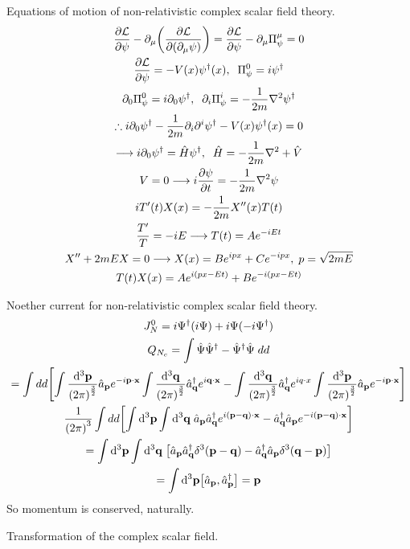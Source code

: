 \documentclass{report}
\begin{document}
\begin{subquests}
	\item Equations of motion of non-relativistic complex scalar field theory.
	\begin{gather*}
		\pdv{\mathcal L}{\psi} - \partial_{\mu}\pqty{\pdv{\mathcal L}{\pqty{\partial_{\mu}\psi}}} = \pdv{\mathcal L}{\psi} - \partial_{\mu}\Pi^{\mu}_{\psi} = 0 \\
		\pdv{\mathcal L}{\psi} = -V(x)\psi^{\dagger}(x), \;\; \Pi^0_{\psi} = i\psi^{\dagger} \\
		\partial_0\Pi^0_{\psi} = i\partial_0 \psi^{\dagger}, \;\; \partial_i \Pi^i_{\psi} = -\frac{1}{2m}\nabla^2\psi^{\dagger}\\
		\therefore i\partial_0 \psi^{\dagger} -\frac{1}{2m}\partial_i\partial^i\psi^{\dagger} - V(x)\psi^{\dagger}(x) = 0 \\
		\longrightarrow i\partial_0\psi^{\dagger} = \hat{H}\psi^{\dagger}, \;\; \hat{H} = -\frac{1}{2m}\nabla^2 + \hat{V} \\
		V = 0 \longrightarrow i\pdv{\psi}{t} = -\frac{1}{2m}\nabla^2\psi \\
		iT'(t)X(x) = -\frac{1}{2m}X''(x)T(t) \\
		\frac{T'}{T} = -iE \longrightarrow T(t) = Ae^{-iEt} \\
		X'' + 2mEX = 0 \longrightarrow X(x) = Be^{ipx} + Ce^{-ipx},\; p = \sqrt{2mE} \\
		T(t)X(x) = Ae^{i(px-Et)} + Be^{-i(px - Et)}
	\end{gather*}

	\item Noether current for non-relativistic complex scalar field theory.
	\begin{gather*}
		J^0_N = i\Psi^{\dagger}(i\Psi) + i\Psi(-i\Psi^{\dagger}) \\
		Q_{N_c} = \int \hat{\Psi}\hat{\Psi}^{\dagger} - \hat{\Psi}^{\dagger}\hat{\Psi}\;dd \\
		= \int dd\bqty{\int \frac{\dd^3{\vb p}}{\pqty{2\pi}^{\frac{3}{2}}}\hat{a}_{\vb p}e^{-i\vb p\cdot \vb x}\int \frac{\dd^3{\vb q}}{\pqty{2\pi}^{\frac{3}{2}}}\hat{a}^{\dagger}_{\vb q}e^{i\vb q\cdot \vb x} - \int \frac{\dd^3{\vb q}}{\pqty{2\pi}^{\frac{3}{2}}}\hat{a}^{\dagger}_{\vb q}e^{iq\cdot x}\int \frac{\dd^3{\vb p}}{\pqty{2\pi}^{\frac{3}{2}}}\hat{a}_{\vb p}e^{-i\vb p\cdot \vb x}} \\
		\frac{1}{\pqty{2\pi}^3}\int dd\bqty{\int \dd^3{\vb p}\int \dd^3{\vb q}\;\hat{a}_{\vb p}\hat{a}^{\dagger}_{\vb q}e^{i(\vb p - \vb q)\cdot \vb x} - \hat{a}^{\dagger}_{\vb q}\hat{a}_{\vb p}e^{-i(\vb p - \vb q)\cdot \vb x}} \\
		= \int \dd^3{\vb p}\int \dd^3{\vb q}\;\bqty{\hat{a}_{\vb p}\hat{a}^{\dagger}_{\vb q}\delta^3(\vb p - \vb q) - \hat{a}^{\dagger}_{\vb q}\hat{a}_{\vb p}\delta^3(\vb q - \vb p)} \\
		= \int \dd^3{\vb p}\bqty{\hat{a}_{\vb p},\hat{a}^{\dagger}_{\vb p}} = \vb p
	\end{gather*}
	So momentum is conserved, naturally.

	\item Transformation of the complex scalar field.
\end{subquests}
\end{document}
